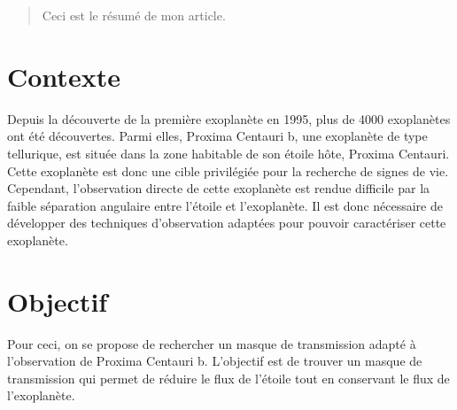 
\begin{abstract}
Ceci est le résumé de mon article.
\end{abstract}

\section{Contexte}
Depuis la découverte de la première exoplanète en 1995, plus de 4000 exoplanètes ont été découvertes. Parmi elles, Proxima Centauri b, une exoplanète de type tellurique, est située dans la zone habitable de son étoile hôte, Proxima Centauri. Cette exoplanète est donc une cible privilégiée pour la recherche de signes de vie. Cependant, l'observation directe de cette exoplanète est rendue difficile par la faible séparation angulaire entre l'étoile et l'exoplanète. Il est donc nécessaire de développer des techniques d'observation adaptées pour pouvoir caractériser cette exoplanète. 

\section{Objectif}
Pour ceci, on se propose de rechercher un masque de transmission adapté à l'observation de Proxima Centauri b. L'objectif est de trouver un masque de transmission qui permet de réduire le flux de l'étoile tout en conservant le flux de l'exoplanète.




